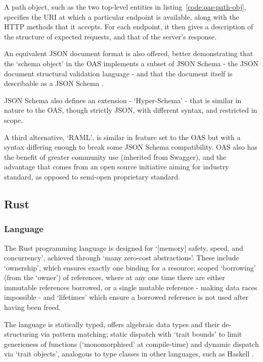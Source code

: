 A path object, such as the two top-level entities in listing~\ref{code:oas-path-obj}, specifies the URI at which a particular endpoint is available, along with the HTTP methods that it accepts. For each endpoint, it then gives a description of the structure of expected requests, and that of the server's response.

An equivalent JSON document format is also offered, better demonstrating that the `schema object' in the OAS implements a subset of JSON Schema \cite{oas_v3} - the JSON document structural validation language \cite{json_schema} - and that the document itself is describable as a JSON Schema \cite{oas_json_schema}.

JSON Schema also defines an extension - `Hyper-Schema' - that is similar in nature to the OAS, though strictly JSON, with different syntax, and restricted in scope. \cite{leach_elegant_apis_2014}

A third alternative, `RAML', is similar in feature set to the OAS but with a syntax differing enough to break some JSON Schema compatibility. \cite{raml_v1} OAS also has the benefit of greater community use (inherited from Swagger), and the advantage that comes from an open source initiative aiming for industry standard, as opposed to semi-open proprietary standard.

\subsection{Rust}
\subsubsection{Language}\label{rust-lang}
The Rust programming language is designed for `[memory] safety, speed, and concurrency', achieved through `many zero-cost abstractions'. These include `ownership', which ensures exactly one binding for a resource; scoped `borrowing' (from the `owner') of references, where at any one time there are either immutable references borrowed, or a single mutable reference - making data races impossible - and `lifetimes' which ensure a borrowed reference is not used after having been freed. \cite{rust_book}

The language is statically typed, offers algebraic data types and their de-structuring via pattern matching; \cite{rust_match_mut_move} static dispatch with `trait bounds' to limit genericness of functions (`monomorphised' at compile-time) \cite{rust_book} and dynamic dispatch via `trait objects', analogous to type classes in other languages, such as Haskell \cite{rust_functional}. \cite{rust_type_system}

